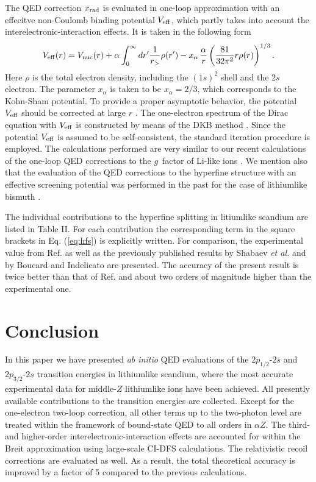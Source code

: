 \documentclass[preprint,aps,pra,showpacs,floatfix]{revtex4}
\newcommand{\az}{\alpha Z}
\newcommand{\Vnucl}{V_{\rm nuc}}
\newcommand{\Veff}{V_{\rm eff}}
\newcommand{\xalpha}{x_{\alpha}}
\begin{document}
The QED correction $x_{\rm{rad}}$ is evaluated in one-loop approximation
with an effecitve non-Coulomb binding potential $\Veff$, which partly takes into
account the interelectronic-interaction effects. It is taken in the following
form \cite{slater,kohn-sham}
%
\begin{eqnarray}
\label{eq:Vscr-dft}
  \Veff(r) = \Vnucl(r) + {\alpha} \int_0^{\infty}dr' \frac{1}{r_>} \rho(r')
  - \xalpha\,\frac{\alpha}{r} \left( \frac{81}{32\pi^2} r \rho(r) \right)^{1/3}.
\end{eqnarray}
%
Here $\rho$ is the total electron density, including the $(1s)^2$ shell and
the $2s$ electron. The parameter $\xalpha$ is taken to be $\xalpha=2/3$, which
corresponds to the Kohn-Sham potential. To provide a proper asymptotic behavior,
the potential $\Veff$ should be corrected at large $r$ \cite{latter}.
The one-electron spectrum of the Dirac equation with $\Veff$ is constructed
by means of the DKB method \cite{shabaev:04:prl}. Since the potential $\Veff$
is assumed to be self-consistent, the standard iteration procedure is employed.
The calculations performed are very similar to our recent calculations of
the one-loop QED corrections to the $g$~factor of Li-like ions \cite{glazov:pla:06}.
We mention also that the evaluation of the QED corrections to the hyperfine
structure with an effective screening potential was performed in the past
for the case of lithiumlike bismuth \cite{sapirstein:03}.

The individual contributions to the hyperfine splitting in litiumlike scandium
are listed in Table II. For each contribution the corresponding term
in the square brackets in Eq. (\ref{eq:hfs}) is explicitly written.
For comparison, the experimental value from Ref. \cite{les:HCI} as well as
the previously published results by Shabaev {\it et al.} \cite{shabaev:97}
and by Boucard and Indelicato \cite{boucard:00} are presented. The accuracy
of the present result is twice better than that of Ref. \cite{shabaev:97}
and about two orders of magnitude higher than the experimental one.
%
%
\section{Conclusion}
\label{section:con}

In this paper we have presented {\it ab initio} QED evaluations of the ${2p_{1/2}}$-${2s}$
and ${2p_{3/2}}$-${2s}$ transition energies in lithiumlike scandium, where
the most accurate experimental data for middle-$Z$ lithiumlike ions have been achieved.
All presently available contributions to the transition energies are collected.
Except for the one-electron two-loop correction, all other terms up to the two-photon
level are treated within the framework of bound-state QED to all orders in $\az$.
%
The third- and higher-order interelectronic-interaction effects are accounted for
within the Breit approximation using large-scale CI-DFS calculations.
The relativistic recoil corrections are evaluated as well. As a result, the total
theoretical accuracy is improved by a factor of 5 compared to the previous
calculations.
\end{document}

